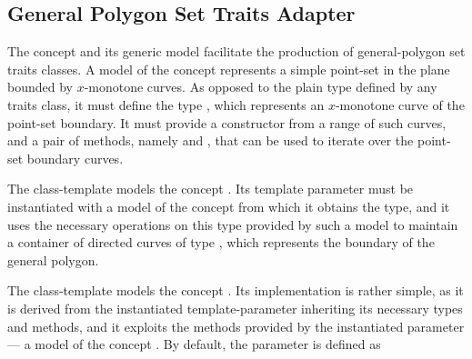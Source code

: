 
\subsection{General Polygon Set Traits Adapter\label{bso_ssec:general_polygon_concept}}

The concept  and its generic model 
 facilitate the 
production of general-polygon set traits classes. A model of the concept 
 represents a simple point-set in the plane bounded 
by $x$-monotone curves. As opposed to the plain  type 
defined by any traits class, it must define the type 
, which represents an $x$-monotone curve of the 
point-set boundary. It must provide a constructor from a range of such 
curves, and a pair of methods, namely  and 
, that can be used to iterate over the point-set boundary 
curves.
 
The class-template 
models the concept . Its template parameter must be
instantiated with a model of the concept
 from which it obtains the 
 type, and it uses the necessary 
operations on this type provided by such a model to maintain a container 
of directed curves of type , which represents the 
boundary of the general polygon.

The class-template 
models the concept . Its implementation is 
rather simple, as it is derived from the instantiated template-parameter 
 inheriting its necessary types and methods, 
and it exploits the methods provided by the instantiated parameter 
 --- a model of the concept .
By default, the  parameter is defined as

